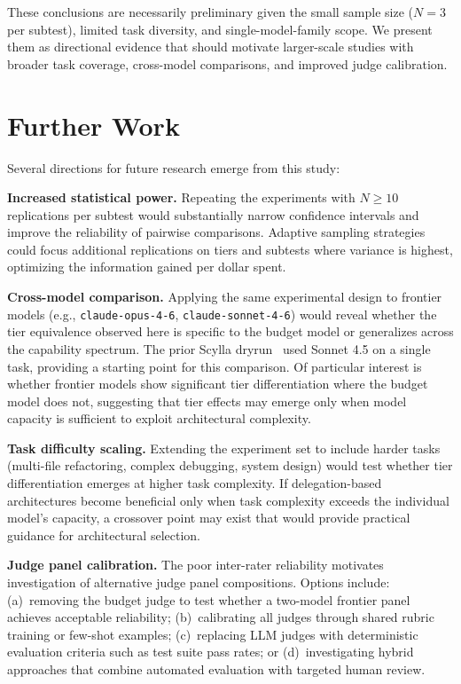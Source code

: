 \documentclass[11pt]{article}
\begin{document}
These conclusions are necessarily preliminary given the small sample size
($N=3$ per subtest), limited task diversity, and single-model-family scope.
We present them as directional evidence that should motivate larger-scale
studies with broader task coverage, cross-model comparisons, and improved
judge calibration.

\section{Further Work}
\label{sec:further_work}

Several directions for future research emerge from this study:

\textbf{Increased statistical power.} Repeating the experiments with
$N \geq 10$ replications per subtest would substantially narrow confidence
intervals and improve the reliability of pairwise comparisons. Adaptive
sampling strategies could focus additional replications on tiers and subtests
where variance is highest, optimizing the information gained per dollar spent.

\textbf{Cross-model comparison.} Applying the same experimental design to
frontier models (e.g., \texttt{claude-opus-4-6}, \texttt{claude-sonnet-4-6})
would reveal whether the tier equivalence observed here is specific to the
budget model or generalizes across the capability spectrum. The prior
Scylla dryrun~\cite{scylla2026dryrun} used Sonnet 4.5 on a single task,
providing a starting point for this comparison. Of particular interest is
whether frontier models show significant tier differentiation where the
budget model does not, suggesting that tier effects may emerge only when
model capacity is sufficient to exploit architectural complexity.

\textbf{Task difficulty scaling.} Extending the experiment set to include
harder tasks (multi-file refactoring, complex debugging, system design) would
test whether tier differentiation emerges at higher task complexity. If
delegation-based architectures become beneficial only when task complexity
exceeds the individual model's capacity, a crossover point may exist that
would provide practical guidance for architectural selection.

\textbf{Judge panel calibration.} The poor inter-rater reliability motivates
investigation of alternative judge panel compositions. Options include:
(a)~removing the budget judge to test whether a two-model frontier panel
achieves acceptable reliability; (b)~calibrating all judges through shared
rubric training or few-shot examples; (c)~replacing LLM judges with
deterministic evaluation criteria such as test suite pass rates; or
(d)~investigating hybrid approaches that combine automated evaluation with
targeted human review.
\end{document}

